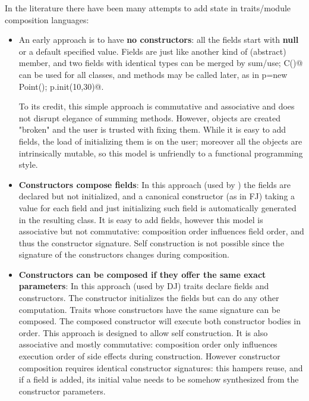 In the literature there have been many attempts to add state in traits/module composition languages:
\begin{itemize}  
\item An early approach is to have {\bf no constructors}: all the fields start with {\bf null} or a default specified value.
  Fields are just like another kind of (abstract) member, and two fields
  with identical types can be merged by sum/use; \Q@new C()@ can be used for all classes, and \Q@init@ methods may be called later, as in
  \Q@Point p=new Point(); p.init(10,30)@.
  
  To its credit, this simple approach is commutative and associative and does not disrupt elegance of summing methods.
  However, objects are created "broken" and the user is trusted with fixing them.
  While it is easy to add fields, the load of initializing them is on the user; moreover
    all the objects are intrinsically mutable, so this model is unfriendly
    to a functional programming style.
\item {\bf Constructors compose fields}:
In this approach (used by \cite{fjig}) the fields are declared but not initialized, and
a canonical constructor (as in FJ) taking a value for each field and just initializing such field
is automatically generated in the resulting class.
It is easy to add fields, however this model is associative but not commutative: composition order influences field order, and thus the constructor signature.
Self construction is not possible 
since the signature of the constructors changes during composition.

\item {\bf Constructors can be composed if they offer the same exact parameters}:
In this approach (used by DJ) traits declare fields and constructors.
The constructor initializes the fields but can do any other computation.
Traits whose constructors have the same signature can be composed.
The composed constructor will execute both constructor bodies in order.
This approach is designed to allow self construction.
It is also associative and mostly commutative: composition order only influences execution order of side effects during construction.
However constructor composition requires identical constructor signatures: this
hampers reuse, and if a field is added, its initial value needs to be
somehow synthesized from the constructor parameters.

\end{itemize}


